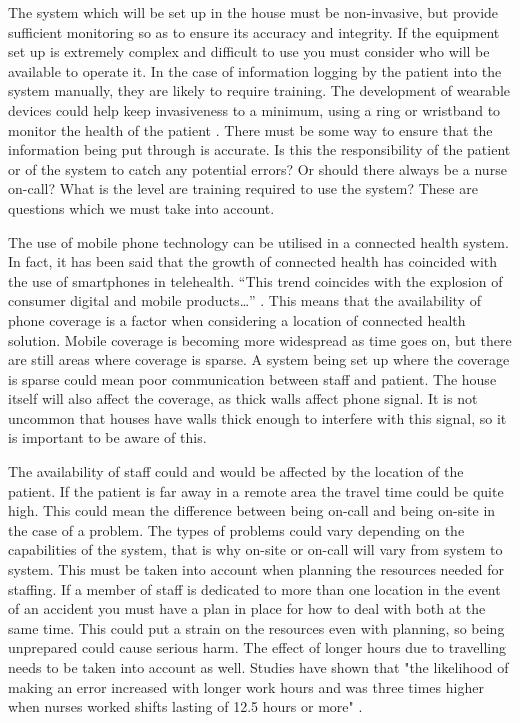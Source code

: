 The system which will be set up in the house must be non-invasive, but provide sufficient monitoring so as to ensure its accuracy and integrity. If the equipment set up is extremely complex and difficult to use you must consider who will be available to operate it. In the case of information logging by the patient into the system manually, they are likely to require training. The development of wearable devices could help keep invasiveness to a minimum, using a ring or wristband to monitor the health of the patient \parencite{home}. There must be some way to ensure that the information being put through is accurate. Is this the responsibility of the patient or of the system to catch any potential errors? Or should there always be a nurse on-call? What is the level are training required to use the system? These are questions which we must take into account.

The use of mobile phone technology can be utilised in a connected health system. In fact, it has been said that the growth of connected health has coincided with the use of smartphones in telehealth. “This trend coincides with the explosion of consumer digital and mobile products…” \parencite{landers}. This means that the availability of phone coverage is a factor when considering a location of connected health solution. Mobile coverage is becoming more widespread as time goes on, but there are still areas where coverage is sparse. A system being set up where the coverage is sparse could mean poor communication between staff and patient. The house itself will also affect the coverage, as thick walls affect phone signal. It is not uncommon that houses have walls thick enough to interfere with this signal, so it is important to be aware of this.

The availability of staff could and would be affected by the location of the patient. If the patient is far away in a remote area the travel time could be quite high. This could mean the difference between being on-call and being on-site in the case of a problem. The types of problems could vary depending on the capabilities of the system, that is why on-site or on-call will vary from system to system. This must be taken into account when planning the resources needed for staffing. If a member of staff is dedicated to more than one location in the event of an accident you must have a plan in place for how to deal with both at the same time. This could put a strain on the resources even with planning, so being unprepared could cause serious harm. The effect of longer hours due to travelling needs to be taken into account as well. Studies have shown that "the likelihood of making an error increased with longer work hours and was three times higher when nurses worked shifts lasting of 12.5 hours or more" \parencite{nursesworking}.

